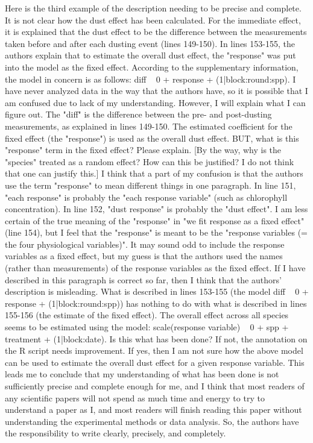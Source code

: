 \documentclass[parskip=half]{scrartcl}
\begin{document}
Here is the third example of the description needing to be precise and complete. It is not clear how the dust effect has been calculated. For the immediate effect, it is explained that the dust effect to be the difference between the measurements taken before and after each dusting event (lines 149-150).
In lines 153-155, the authors explain that to estimate the overall dust effect, the "response" was put into the model as the fixed effect. According to the supplementary information, the model in concern is as follows: diff ~ 0 + response + (1|block:round:spp). I have never analyzed data in the way that the authors have, so it is possible that I am confused due to lack of my understanding. However, I will explain what I can figure out. The "diff" is the difference between the pre- and post-dusting measurements, as explained in lines 149-150. The estimated coefficient for the fixed effect (the "response") is used as the overall dust effect. BUT, what is this "response" term in the fixed effect? Please explain. [By the way, why is the "species" treated as a random effect? How can this be justified? I do not think that one can justify this.]
I think that a part of my confusion is that the authors use the term "response" to mean different things in one paragraph. In line 151, "each response" is probably the "each response variable" (such as chlorophyll concentration). In line 152, "dust response" is probably the "dust effect". I am less certain of the true meaning of the "response" in "we fit response as a fixed effect" (line 154), but I feel that the "response" is meant to be the "response variables (= the four physiological variables)". It may sound odd to include the response variables as a fixed effect, but my guess is that the authors used the names (rather than measurements) of the response variables as the fixed effect.
If I have described in this paragraph is correct so far, then I think that the authors' description is misleading. What is described in lines 153-155 (the model diff ~ 0 + response + (1|block:round:spp)) has nothing to do with what is described in lines 155-156 (the estimate of the fixed effect). The overall effect across all species seems to be estimated using the model: scale(response variable) ~ 0 + spp + treatment + (1|block:date). Is this what has been done? If not, the annotation on the R script needs improvement. If yes, then I am not sure how the above model can be used to estimate the overall dust effect for a given response variable. This leads me to conclude that my understanding of what has been done is not sufficiently precise and complete enough for me, and I think that most readers of any scientific papers will not spend as much time and energy to try to understand a paper as I, and most readers will finish reading this paper without understanding the experimental methods or data analysis. So, the authors have the responsibility to write clearly, precisely, and completely.
\end{document}

